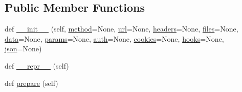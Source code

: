 \subsection*{Public Member Functions}
\begin{DoxyCompactItemize}
\item 
def \hyperlink{classpip_1_1__vendor_1_1requests_1_1models_1_1Request_a08cc53ad5e35305ac699e7457473d756}{\+\_\+\+\_\+init\+\_\+\+\_\+} (self, \hyperlink{classpip_1_1__vendor_1_1requests_1_1models_1_1Request_a1abe778109e5e62b9899212a82f35c21}{method}=None, \hyperlink{classpip_1_1__vendor_1_1requests_1_1models_1_1Request_a2f09fa6b6d5dc1b66f18f35c87a6a9ac}{url}=None, \hyperlink{classpip_1_1__vendor_1_1requests_1_1models_1_1Request_ad4046fa53a2dc5072f91e798328cdc8d}{headers}=None, \hyperlink{classpip_1_1__vendor_1_1requests_1_1models_1_1Request_a30545c8379b7cc31c6d2fc63d909f7fb}{files}=None, \hyperlink{classpip_1_1__vendor_1_1requests_1_1models_1_1Request_a6f8c20c420d2876df5ceed3b47ae7f10}{data}=None, \hyperlink{classpip_1_1__vendor_1_1requests_1_1models_1_1Request_af0c527889cc5ac1f6984c1e5a304a291}{params}=None, \hyperlink{classpip_1_1__vendor_1_1requests_1_1models_1_1Request_a1ee0c0977e654596a8a8b3ed4bf6b867}{auth}=None, \hyperlink{classpip_1_1__vendor_1_1requests_1_1models_1_1Request_a2469f801afbf4ffe3bc894b56e769f0a}{cookies}=None, \hyperlink{classpip_1_1__vendor_1_1requests_1_1models_1_1Request_a84e606481a29a063b2631d867ece6385}{hooks}=None, \hyperlink{classpip_1_1__vendor_1_1requests_1_1models_1_1Request_af58d7221f333c2a768935c96af37c82c}{json}=None)
\item 
def \hyperlink{classpip_1_1__vendor_1_1requests_1_1models_1_1Request_a932d3ee07b7e2f0e45f6b59fbffc90d6}{\+\_\+\+\_\+repr\+\_\+\+\_\+} (self)
\item 
def \hyperlink{classpip_1_1__vendor_1_1requests_1_1models_1_1Request_a1aef1fe537b8565201546df0e993c6c1}{prepare} (self)
\end{DoxyCompactItemize}
